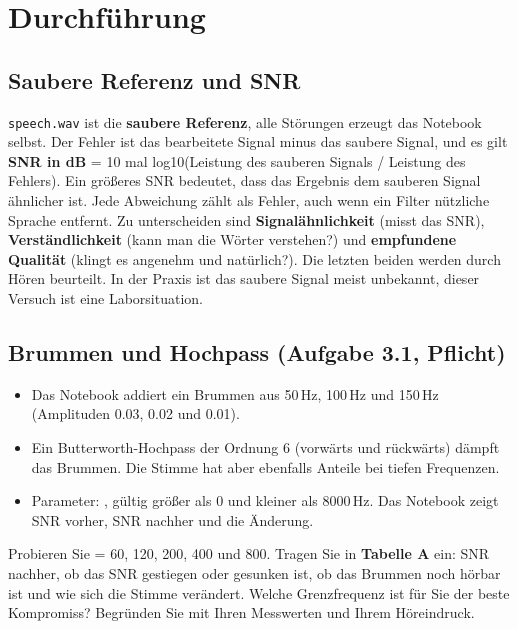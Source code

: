 \documentclass[11pt]{article}
\begin{document}
\bigskip
\section{Durchführung}

\subsection{Saubere Referenz und SNR}


\texttt{speech.wav} ist die \textbf{saubere Referenz}, alle Störungen erzeugt das Notebook selbst. Der Fehler ist das bearbeitete Signal minus das saubere Signal, und es gilt \textbf{SNR in dB} = 10 mal log10(Leistung des sauberen Signals / Leistung des Fehlers). Ein größeres SNR bedeutet, dass das Ergebnis dem sauberen Signal ähnlicher ist. Jede Abweichung zählt als Fehler, auch wenn ein Filter nützliche Sprache entfernt. Zu unterscheiden sind \textbf{Signalähnlichkeit} (misst das SNR), \textbf{Verständlichkeit} (kann man die Wörter verstehen?) und \textbf{empfundene Qualität} (klingt es angenehm und natürlich?). Die letzten beiden werden durch Hören beurteilt. In der Praxis ist das saubere Signal meist unbekannt, dieser Versuch ist eine Laborsituation.

\subsection[Brummen und Hochpass]{Brummen und Hochpass (Aufgabe 3.1, Pflicht)}


\begin{itemize}
  \item Das Notebook addiert ein Brummen aus 50\,Hz, 100\,Hz und 150\,Hz (Amplituden 0.03, 0.02 und 0.01).
  \item Ein Butterworth-Hochpass der Ordnung 6 (vorwärts und rückwärts) dämpft das Brummen. Die Stimme hat aber ebenfalls Anteile bei tiefen Frequenzen.
  \item Parameter: , gültig größer als 0 und kleiner als 8000\,Hz. Das Notebook zeigt SNR vorher, SNR nachher und die Änderung.
\end{itemize}

\begin{block}
Probieren Sie  = 60, 120, 200, 400 und 800. Tragen Sie in \textbf{Tabelle A} ein: SNR nachher, ob das SNR gestiegen oder gesunken ist, ob das Brummen noch hörbar ist und wie sich die Stimme verändert. Welche Grenzfrequenz ist für Sie der beste Kompromiss? Begründen Sie mit Ihren Messwerten und Ihrem Höreindruck.
\end{block}
\end{document}
